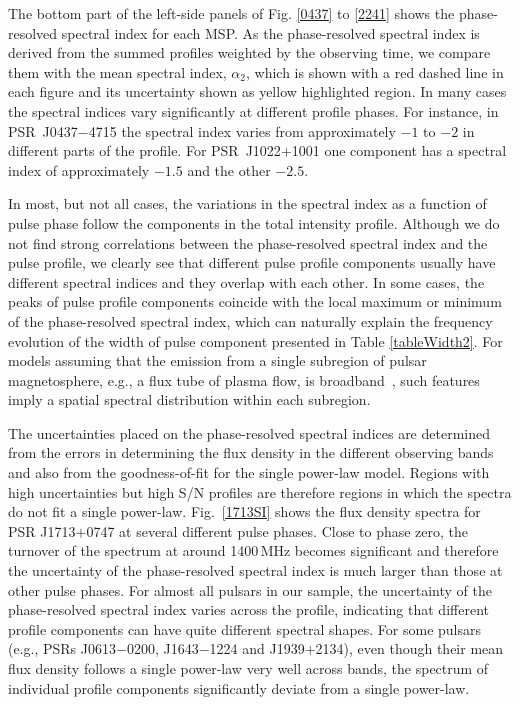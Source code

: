 \documentclass[useAMS,usenatbib]{mn2e}
\begin{document}
The bottom part of the left-side panels of Fig. \ref{0437} to 
\ref{2241} shows the phase-resolved spectral index for each MSP. 
%
As the phase-resolved spectral index is derived from the summed profiles weighted 
by the observing time, we compare them with the mean spectral index, $\alpha_2$, 
which is shown with a red dashed line in each figure and its uncertainty shown as 
yellow highlighted region.
%
In many cases the spectral indices vary significantly at different profile phases. 
For instance, in PSR~J0437$-$4715 the spectral index varies from approximately $-1$ to $-2$ in 
different parts of the profile. For PSR~J1022$+$1001 one component has a spectral 
index of approximately $-1.5$ and the other $-2.5$. 
%

In most, but not all cases, the variations in the spectral index as a function of 
pulse phase follow the components in the total intensity profile. 
Although we do not find strong correlations between the phase-resolved spectral 
index and the pulse profile, we clearly see that different pulse profile components usually 
have different spectral indices and they overlap with each other. In some cases, 
the peaks of pulse profile components coincide with the local maximum or minimum 
of the phase-resolved spectral index, which can naturally explain the frequency 
evolution of the width of pulse component presented in Table \ref{tableWidth2}. 
%
For models assuming that the emission from a single subregion of pulsar magnetosphere, 
e.g., a flux tube of plasma flow, is broadband~\citep[e.g.,][]{Michel87,Dyks10,Wang14},
such features imply a spatial spectral distribution within each subregion.

%
The uncertainties placed on the phase-resolved spectral indices are determined from 
the errors in determining the flux density in the different observing bands and also 
from the goodness-of-fit for the single power-law model.  
%
Regions with high uncertainties but high S/N profiles are therefore regions in 
which the spectra do not fit a single power-law. 
%
Fig.~\ref{1713SI} shows the flux density spectra for PSR J1713$+$0747 at several 
different pulse phases. Close to phase zero, the turnover of the spectrum at around 
1400\,MHz becomes significant and therefore the uncertainty of the phase-resolved 
spectral index is much larger than those at other pulse phases.
%
For almost all pulsars in our sample, the uncertainty of the phase-resolved spectral 
index varies across the profile, indicating that different profile components  
can have quite different spectral shapes. For some pulsars (e.g., PSRs J0613$-$0200, 
J1643$-$1224 and J1939$+$2134), even though their mean flux density follows a 
single power-law very well across bands, the spectrum of individual profile 
components significantly deviate from a single power-law.
%
\end{document}

